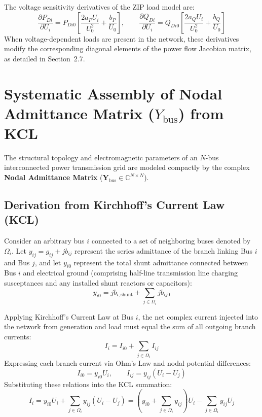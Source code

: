 \documentclass[12pt,a4paper,oneside]{report}
\begin{document}
The voltage sensitivity derivatives of the ZIP load model are:
\begin{equation}
\frac{\partial P_{Di}}{\partial U_i} = P_{Di0} \left[ \frac{2 a_P U_i}{U_0^2} + \frac{b_P}{U_0} \right], \qquad \frac{\partial Q_{Di}}{\partial U_i} = Q_{Di0} \left[ \frac{2 a_Q U_i}{U_0^2} + \frac{b_Q}{U_0} \right]
\end{equation}
When voltage-dependent loads are present in the network, these derivatives modify the corresponding diagonal elements of the power flow Jacobian matrix, as detailed in Section~2.7.

\section{Systematic Assembly of Nodal Admittance Matrix ($Y_{\text{bus}}$) from KCL}
The structural topology and electromagnetic parameters of an $N$-bus interconnected power transmission grid are modeled compactly by the complex \textbf{Nodal Admittance Matrix} ($\mathbf{Y}_{\text{bus}} \in \mathbb{C}^{N \times N}$).

\subsection{Derivation from Kirchhoff's Current Law (KCL)}
Consider an arbitrary bus $i$ connected to a set of neighboring buses denoted by $\Omega_i$. Let $y_{ij} = g_{ij} + jb_{ij}$ represent the series admittance of the branch linking Bus $i$ and Bus $j$, and let $y_{i0}$ represent the total shunt admittance connected between Bus $i$ and electrical ground (comprising half-line transmission line charging susceptances and any installed shunt reactors or capacitors):
\begin{equation}
y_{i0} = j b_{i,\text{shunt}} + \sum_{j \in \Omega_i} j b_{ij0}
\end{equation}

Applying Kirchhoff's Current Law at Bus $i$, the net complex current injected into the network from generation and load must equal the sum of all outgoing branch currents:
\begin{equation}
I_i = I_{i0} + \sum_{j \in \Omega_i} I_{ij}
\end{equation}
Expressing each branch current via Ohm's Law and nodal potential differences:
\begin{equation}
I_{i0} = y_{i0} U_i, \qquad I_{ij} = y_{ij} (U_i - U_j)
\end{equation}
Substituting these relations into the KCL summation:
\begin{equation}
I_i = y_{i0} U_i + \sum_{j \in \Omega_i} y_{ij} (U_i - U_j) = \left( y_{i0} + \sum_{j \in \Omega_i} y_{ij} \right) U_i - \sum_{j \in \Omega_i} y_{ij} U_j
\end{equation}
\end{document}
